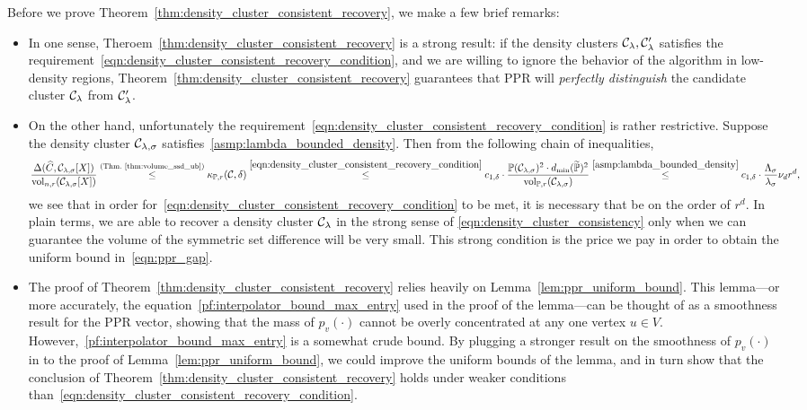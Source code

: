 Before we prove Theorem~\ref{thm:density_cluster_consistent_recovery}, we make a few brief remarks:
\begin{itemize}
	\item In one sense, Theroem~\ref{thm:density_cluster_consistent_recovery} is a strong result: if the density clusters $\mathcal{C}_{\lambda},\mathcal{C}_{\lambda}'$ satisfies the requirement~\eqref{eqn:density_cluster_consistent_recovery_condition}, and we are willing to ignore the behavior of the algorithm in low-density regions, Theorem~\ref{thm:density_cluster_consistent_recovery} guarantees that PPR will \emph{perfectly distinguish} the candidate cluster $\mathcal{C}_{\lambda}$ from $\mathcal{C}_{\lambda}'$.
	
	\item On the other hand, unfortunately the requirement~\eqref{eqn:density_cluster_consistent_recovery_condition} is rather restrictive. Suppose the density cluster $\mathcal{C}_{\lambda,\sigma}$ satisfies~\ref{asmp:lambda_bounded_density}. Then from the following chain of inequalities,
	\begin{equation*}
	\frac{\Delta(\widehat{C}, \mathcal{C}_{\lambda,\sigma}[X])}{\mathrm{vol}_{n,r}(\mathcal{C}_{\lambda,\sigma}[X])} \overset{(\textrm{Thm.~\ref{thm:volume_ssd_ub}})}{\leq} \kappa_{\mathbb{P},r}(\mathcal{C},\delta) \overset{\eqref{eqn:density_cluster_consistent_recovery_condition}}{\leq} c_{1,\delta} \cdot \frac{\mathbb{P}(\mathcal{C}_{\lambda,\sigma})^2 \cdot d_{\min}(\widetilde{\mathbb{P}})^2}{\mathrm{vol}_{\mathbb{P},r}(\mathcal{C}_{\lambda,\sigma})} \overset{\ref{asmp:lambda_bounded_density}}{\leq} c_{1,\delta} \cdot \frac{\Lambda_{\sigma}}{\lambda_{\sigma}} \nu_d r^d,
	\end{equation*}
	we see that in order for~\eqref{eqn:density_cluster_consistent_recovery_condition} to be met, it is necessary that  be on the order of $r^d$. In plain terms, we 
	are able to recover a density cluster $\mathcal{C}_{\lambda}$ in the strong sense of
	\eqref{eqn:density_cluster_consistency} only when we can guarantee the volume of the symmetric set difference will be very small. This strong condition is
	the price we pay in order to obtain the uniform bound in~\eqref{eqn:ppr_gap}. 
	\item The proof of Theorem~\ref{thm:density_cluster_consistent_recovery} relies heavily on Lemma~\ref{lem:ppr_uniform_bound}. This lemma---or more accurately, the equation~\eqref{pf:interpolator_bound_max_entry} used in the proof of the lemma---can be thought of as a smoothness result for the PPR vector, showing that the mass of $p_v(\cdot)$ cannot be overly concentrated at any one vertex $u \in V$. However,~\eqref{pf:interpolator_bound_max_entry} is a somewhat crude bound. By plugging a stronger result on the smoothness of $p_v(\cdot)$ in to the proof of Lemma~\ref{lem:ppr_uniform_bound}, we could improve the uniform bounds of the lemma, and in turn show that the conclusion of Theorem~\ref{thm:density_cluster_consistent_recovery} holds under weaker conditions than~\eqref{eqn:density_cluster_consistent_recovery_condition}. 
\end{itemize}  

